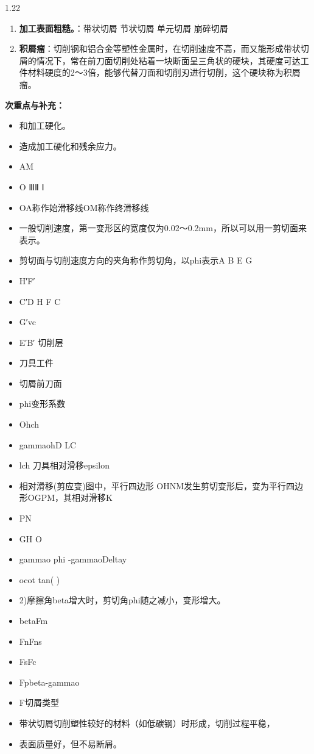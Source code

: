 \documentclass[12pt,a4paper]{article}
\begin{document}
\begin{spacing}{1.22}
\begin{tcolorbox}[colback=yellow!6,colframe=red!55!black,title=重点,left=1mm,right=1mm]
\begin{enumerate}[leftmargin=2.2em,label=\arabic*.]
  \item \textbf{加工表面粗糙。}：带状切屑 节状切屑 单元切屑 崩碎切屑
  \item \textbf{积屑瘤}：切削钢和铝合金等塑性金属时，在切削速度不高，而又能形成带状切屑的情况下，常在前刀面切削处粘着一块断面呈三角状的硬块，其硬度可达工件材料硬度的2～3倍，能够代替刀面和切削刃进行切削，这个硬块称为积屑瘤。
\end{enumerate}
\end{tcolorbox}
\noindent\textbf{次重点与补充：}
\begin{itemize}[leftmargin=2.2em,label=--]
  \item 和加工硬化。
  \item 造成加工硬化和残余应力。
  \item AM
  \item O ⅢⅡ Ⅰ
  \item OA称作始滑移线OM称作终滑移线
  \item 一般切削速度，第一变形区的宽度仅为0.02～0.2mm，所以可以用一剪切面来表示。
  \item 剪切面与切削速度方向的夹角称作剪切角，以phi表示A B E G
  \item H′F′
  \item C′D H F C
  \item G′vc
  \item E′B′ 切削层
  \item 刀具工件
  \item 切屑前刀面
  \item phi变形系数
  \item Ohch
  \item gammaohD LC
  \item lch 刀具相对滑移epsilon
  \item 相对滑移(剪应变)图中，平行四边形 OHNM发生剪切变形后，变为平行四边形OGPM，其相对滑移K
  \item PN
  \item GH O
  \item gammao phi -gammaoDeltay
  \item ocot tan( )
  \item 2)摩擦角beta增大时，剪切角phi随之减小，变形增大。
  \item betaFm
  \item FnFns
  \item FsFc
  \item Fpbeta-gammao
  \item F切屑类型
  \item 带状切屑切削塑性较好的材料（如低碳钢）时形成，切削过程平稳，
  \item 表面质量好，但不易断屑。

\end{itemize}
\end{spacing}
\end{document}
